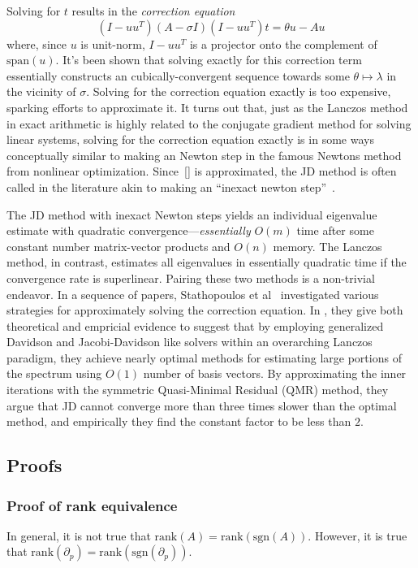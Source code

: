 \documentclass[12pt]{article}
\numberwithin{equation}{section}
\newcommand{\+}{%
	\raisebox{0.18ex}{\scaleobj{0.55}{+}}
}
\theoremstyle{definition}
\begin{document}
Solving for $t$ results in the \emph{correction equation}
\begin{equation}
	(I - u u^T)(A - \sigma I )(I - u u^T) t = \theta u - A u 
\end{equation}
where, since $u$ is unit-norm, $I - u u^T$ is a projector onto the complement of $\mathrm{span}(u)$. 
It's been shown that solving exactly for this correction term essentially constructs an cubically-convergent sequence towards some $\theta \mapsto \lambda$ in the vicinity of $\sigma$. Solving for the correction equation exactly is too expensive, sparking efforts to approximate it. It turns out that, just as the Lanczos method in exact arithmetic is highly related to the conjugate gradient method for solving linear systems, solving for the correction equation exactly is in some ways conceptually similar to making an Newton step in the famous Newtons method from nonlinear optimization. Since~\eqref{} is approximated, the JD method is often called in the literature akin to making an ``inexact newton step''~\cite{}.


The JD method with inexact Newton steps yields an individual eigenvalue estimate with quadratic convergence---\emph{essentially} $O(m)$ time after some constant number matrix-vector products and $O(n)$ memory.
The Lanczos method, in contrast, estimates all eigenvalues in essentially quadratic time if the convergence rate is superlinear. Pairing these two methods is a non-trivial endeavor. 
In a sequence of papers, Stathopoulos et al~\cite{} investigated various strategies for approximately solving the correction equation. 
In , they give both theoretical and empricial evidence to suggest that by employing generalized Davidson and Jacobi-Davidson like solvers within an overarching Lanczos paradigm, they achieve nearly optimal methods for estimating large portions of the spectrum using $O(1)$ number of basis vectors. By approximating the inner iterations with the symmetric Quasi-Minimal Residual (QMR) method, they argue that JD cannot converge more than three times slower than the optimal method, and empirically they find the constant factor to be less than $2$. 


\subsection{Proofs}
\subsubsection*{Proof of rank equivalence}
In general, it is not true that $\mathrm{rank}(A) = \mathrm{rank}(\mathrm{sgn}(A))$. 
However, it is true that $\mathrm{rank}(\partial_p) = \mathrm{rank}(\mathrm{sgn}(\partial_p))$.
\end{document}
